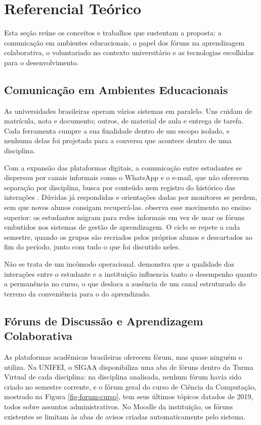 \section{Referencial Teórico}
\label{referencial}

Esta seção reúne os conceitos e trabalhos que sustentam a proposta: a comunicação em ambientes educacionais, o papel dos fóruns na aprendizagem colaborativa, o voluntariado no contexto universitário e as tecnologias escolhidas para o desenvolvimento.

\subsection{Comunicação em Ambientes Educacionais}

As universidades brasileiras operam vários sistemas em paralelo. Uns cuidam de matrícula, nota e documento; outros, de material de aula e entrega de tarefa. Cada ferramenta cumpre a sua finalidade dentro de um escopo isolado, e nenhuma delas foi projetada para a conversa que acontece dentro de uma disciplina.

Com a expansão das plataformas digitais, a comunicação entre estudantes se dispersou por canais informais como o WhatsApp e o e-mail, que não oferecem separação por disciplina, busca por conteúdo nem registro do histórico das interações \citep{alves2023}. Dúvidas já respondidas e orientações dadas por monitores se perdem, sem que novos alunos consigam recuperá-las. \citet{kent2013} observa esse movimento no ensino superior: os estudantes migram para redes informais em vez de usar os fóruns embutidos nos sistemas de gestão de aprendizagem. O ciclo se repete a cada semestre, quando os grupos são recriados pelos próprios alunos e descartados ao fim do período, junto com tudo o que foi discutido neles.

Não se trata de um incômodo operacional. \citet{kuh2009} demonstra que a qualidade das interações entre o estudante e a instituição influencia tanto o desempenho quanto a permanência no curso, o que desloca a ausência de um canal estruturado do terreno da conveniência para o do aprendizado.

\subsection{Fóruns de Discussão e Aprendizagem Colaborativa}

As plataformas acadêmicas brasileiras oferecem fórum, mas quase ninguém o utiliza. Na UNIFEI, o SIGAA disponibiliza uma aba de fóruns dentro da Turma Virtual de cada disciplina: na disciplina analisada, nenhum fórum havia sido criado no semestre corrente, e o fórum geral do curso de Ciência da Computação, mostrado na Figura \ref{fig-forum-curso}, tem seus últimos tópicos datados de 2019, todos sobre assuntos administrativos. No Moodle da instituição, os fóruns existentes se limitam às abas de avisos criadas automaticamente pelo sistema.

